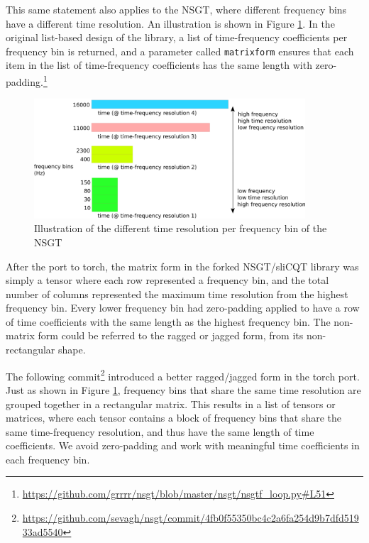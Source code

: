 \documentclass[report.tex]{subfiles}
\begin{document}
This same statement also applies to the NSGT, where different frequency bins have a different time resolution. An illustration is shown in Figure \ref{fig:raggedslicqt}. In the original list-based design of the library, a list of time-frequency coefficients per frequency bin is returned, and a parameter called \Verb#matrixform# ensures that each item in the list of time-frequency coefficients has the same length with zero-padding.\footnote{\url{https://github.com/grrrr/nsgt/blob/master/nsgt/nsgtf_loop.py\#L51}}

\begin{figure}[ht]
	\centering
	\includegraphics[width=0.9\textwidth]{./images-misc/slicq_shape.png}
	\caption{Illustration of the different time resolution per frequency bin of the NSGT}
	\label{fig:raggedslicqt}
\end{figure}

After the port to torch, the matrix form in the forked NSGT/sliCQT library was simply a tensor where each row represented a frequency bin, and the total number of columns represented the maximum time resolution from the highest frequency bin. Every lower frequency bin had zero-padding applied to have a row of time coefficients with the same length as the highest frequency bin. The non-matrix form could be referred to the ragged or jagged form, from its non-rectangular shape.

The following commit\footnote{\url{https://github.com/sevagh/nsgt/commit/4fb0f55350bc4c2a6fa254d9b7dfd51933ad5540}} introduced a better ragged/jagged form in the torch port. Just as shown in Figure \ref{fig:raggedslicqt}, frequency bins that share the same time resolution are grouped together in a rectangular matrix. This results in a list of tensors or matrices, where each tensor contains a block of frequency bins that share the same time-frequency resolution, and thus have the same length of time coefficients. We avoid zero-padding and work with meaningful time coefficients in each frequency bin.
\end{document}
